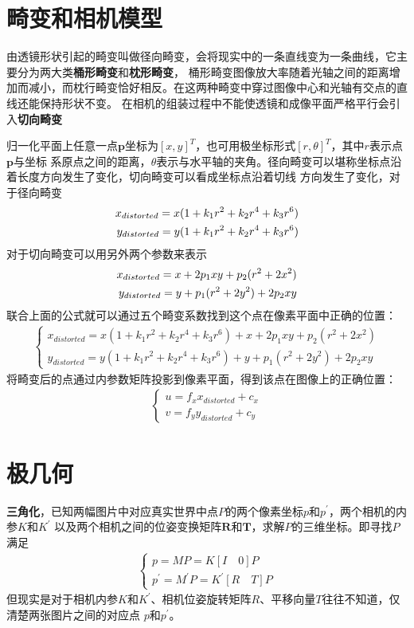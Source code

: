 \documentclass[10pt]{article}
\begin{document}
\section{畸变和相机模型}
由透镜形状引起的畸变叫做径向畸变，会将现实中的一条直线变为一条曲线，它主要分为两大类\textbf{桶形畸变}和\textbf{枕形畸变}，
桶形畸变图像放大率随着光轴之间的距离增加而减小，而枕行畸变恰好相反。在这两种畸变中穿过图像中心和光轴有交点的直线还能保持形状不变。
在相机的组装过程中不能使透镜和成像平面严格平行会引入\textbf{切向畸变}

归一化平面上任意一点$\mathbf{p}$坐标为$[x,y]^{T}$，也可用极坐标形式$[r,\theta]^{T}$，其中$r$表示点$\mathbf{p}$与坐标
系原点之间的距离，$\theta$表示与水平轴的夹角。径向畸变可以堪称坐标点沿着长度方向发生了变化，切向畸变可以看成坐标点沿着切线
方向发生了变化，对于径向畸变
\begin{align} 
    x_{distorted}=x(1+k_{1}r^{2}+k_{2}r^{4}+k_{3}r^{6}) \notag\\
    y_{distorted}=y(1+k_{1}r^{2}+k_{2}r^{4}+k_{3}r^{6})
\end{align} 
对于切向畸变可以用另外两个参数来表示
\begin{align} 
    x_{distorted}=x+2p_{1}xy+p_{2}(r^{2}+2x^{2}) \notag \\
    y_{distorted}=y+p_{1}(r^{2}+2y^{2})+2p_{2}xy
\end{align} 
联合上面的公式就可以通过五个畸变系数找到这个点在像素平面中正确的位置：
\begin{align} 
    \left\{\begin{array}{l}
        x_{distorted}=x(1+k_{1}r^{2}+k_{2}r^{4}+k_{3}r^{6})+x+2p_{1}xy+p_{2}(r^{2}+2x^{2}) \\
        y_{distorted}=y(1+k_{1}r^{2}+k_{2}r^{4}+k_{3}r^{6})+y+p_{1}(r^{2}+2y^{2})+2p_{2}xy
    \end{array}\right.
\end{align}
将畸变后的点通过内参数矩阵投影到像素平面，得到该点在图像上的正确位置：
\begin{align} 
    \left\{\begin{array}{l}
        u=f_{x}x_{distorted}+c_{x} \\
        v=f_{y}y_{distorted}+c_{y}
    \end{array}\right.
\end{align}
\section{极几何}
\textbf{三角化}，已知两幅图片中对应真实世界中点$P$的两个像素坐标$p$和$p^{'}$，两个相机的内参$K$和$K^{'}$
以及两个相机之间的位姿变换矩阵$\mathbf{R}$和$\mathbf{T}$，求解$P$的三维坐标。即寻找$P$满足
\begin{align} 
    \left\{\begin{array}{l}p=MP=K[I\quad 0]P \\ p^{'}=M^{'}P=K^{'}[R\quad T]P\end{array}\right.
\end{align} 
但现实是对于相机内参$K$和$K^{'}$、相机位姿旋转矩阵$R$、平移向量$T$往往不知道，仅清楚两张图片之间的对应点
$p$和$p^{'}$。
\end{document}
